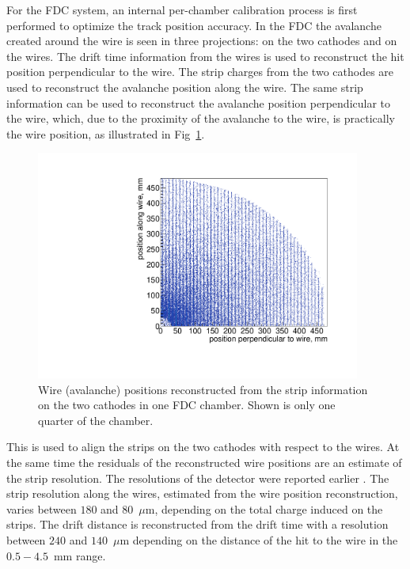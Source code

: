 For the FDC system, an internal per-chamber calibration process is first performed to optimize the track position accuracy.  
In the FDC the avalanche created around the wire is seen in three projections: on the two cathodes and on the wires.
The drift time information from the wires is used to reconstruct the hit position perpendicular to the wire.
The strip charges from the two cathodes are used to reconstruct the avalanche position along the wire. 
The same strip information can be used to reconstruct the avalanche position perpendicular to the wire,  which, due to the proximity of the avalanche to the wire, is practically the wire position, as illustrated in Fig~\ref{FDC_wires_from_strips}.
\begin{figure}[tbp]
\begin{center}
\includegraphics[width=0.95\textwidth]{figures/FDC_wires_from_strips1.pdf}  
\caption{\label{FDC_wires_from_strips} Wire (avalanche) positions reconstructed from the strip information on the two cathodes in one FDC chamber. Shown is only one quarter of the chamber.
}   
\end{center}  
\end{figure}
This is used to align the strips on the two cathodes with respect to the wires. 
At the same time the residuals of the reconstructed wire positions are an estimate of the strip resolution.
The resolutions of the detector were reported earlier \cite{FDC_NIM}. 
The strip resolution along the wires, estimated from the wire position reconstruction, varies between $180$ and $80$~$\mu$m, depending on the total charge induced on the strips. The drift distance is reconstructed from the drift time with a resolution between $240$ and $140$~$\mu$m
depending on the distance of the hit to the wire in the $0.5-4.5$~mm range.  

